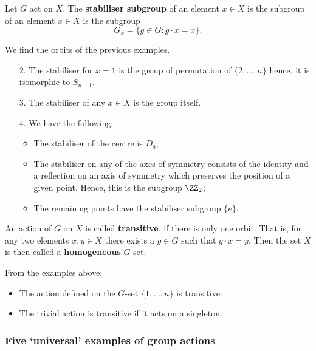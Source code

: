 \documentclass[12pt, a4paper]{article}
\begin{document}
\begin{definition}
    Let \(G\) act on \(X\). The \textbf{stabiliser subgroup} of an element \(x \in X\) is the subgroup of an element \(x \in X\) is the subgroup 
    \[G_x = \{g \in G : g\cdot x =x\}.\]
\end{definition}

\begin{example}
    We find the orbits of the previous examples.
    \begin{enumerate}
        \item[2.] The stabiliser for \(x=1\) is the group of permutation of \(\{2,\ldots,n\}\) hence, it is isomorphic to \(S_{n-1}\).
        \item[3.] The stabiliser of any \(x \in X\) is the group itself.
        \item[4.] We have the following:
        \begin{itemize}
            \item The stabiliser of the centre is \(D_8\);
            \item The stabiliser on any of the axes of symmetry consists of the identity and a reflection on an axis of symmetry which preserves the position of a given point. Hence, this is the subgroup \(\ZZ_2\);
            \item The remaining points have the stabiliser subgroup \(\{e\}\).
        \end{itemize}
    \end{enumerate}
\end{example}

\begin{definition}
    An action of \(G\) on \(X\) is called \textbf{transitive}, if there is only one orbit. That is, for any two elements \(x,y \in X\) there exists a \(g \in G\) such that \(g \cdot x =y\).
    Then the set \(X\) is then called a \textbf{homogeneous} \(G\)-set.
\end{definition}

\begin{mdexample}
    From the examples above:
    \begin{itemize}
        \item The action defined on the \(G\)-set \(\{1,\ldots,n\}\) is transitive.
        \item The trivial action is transitive if it acts on a singleton.
    \end{itemize}
\end{mdexample}

\subsubsection{Five `universal' examples of group actions}
\end{document}
